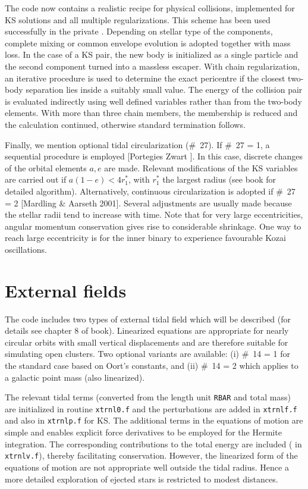 \documentclass[12pt]{article}
\begin{document}
The code now contains a realistic recipe for physical collisions,
implemented for KS solutions and all multiple regularizations.
This scheme has been used successfully in the private {}.
Depending on stellar type of the components, complete mixing or common
envelope evolution is adopted together with mass loss.
In the case of a KS pair, the new \cm body is initialized as a
single particle and the second component turned into a massless escaper.
With chain regularization, an iterative procedure is used to determine the
exact pericentre if the closest two-body separation lies inside a suitably
small value.
The energy of the collision pair is evaluated indirectly using well defined
variables rather than from the two-body elements.
With more than three chain members, the membership is reduced and the
calculation continued, otherwise standard termination follows.

Finally, we mention optional tidal circularization (\#~27).
If \#~27 = 1, a sequential procedure is employed
[Portegies Zwart ].
In this case, discrete changes of the orbital elements $a, e$ are made.
Relevant modifications of the KS variables are carried out if
$a (1 - e) < 4 r^{\ast}_1$, with $r^{\ast}_1$ the largest radius (see book
for detailed algorithm).
Alternatively, continuous circularization is adopted if \#~27 = 2
[Mardling \& Aarseth 2001].
Several adjustments are usually made because the stellar radii tend to
increase with time.
Note that for very large eccentricities, angular momentum conservation
gives rise to considerable shrinkage.
One way to reach large eccentricity is for the inner binary to experience
favourable Kozai oscillations.

\section{External fields}

The code includes two types of external tidal field which will be described
(for details see chapter 8 of book).
Linearized equations are appropriate for nearly circular orbits with
small vertical displacements and are therefore suitable for simulating
open clusters.
Two optional variants are available: (i) \#~14 = 1 for the standard case
based on Oort's constants, and (ii) \#~14 = 2 which applies to a galactic
point mass (also linearized).

The relevant tidal terms (converted from the length unit {\tt RBAR} and
total mass) are initialized in routine {\tt xtrnl0.f} and the perturbations
are added in {\tt xtrnlf.f} and also in {\tt xtrnlp.f} for KS.
The additional terms in the equations of motion are simple and enables
explicit force derivatives to be employed for the Hermite integration.
The corresponding contributions to the total energy are included
( in {\tt xtrnlv.f}), thereby facilitating conservation.
However, the linearized form of the equations of motion are not appropriate
well outside the tidal radius.
Hence a more detailed exploration of ejected stars is restricted to modest
distances.
\end{document}
